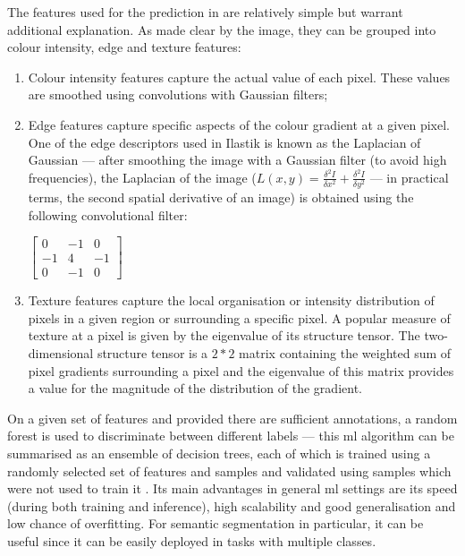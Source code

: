 \begin{figure}[!ht]
	\label{fig:segmentation-example}
\end{figure}

The features used for the prediction in  are relatively simple but warrant additional explanation. As made clear by the image, they can be grouped into colour intensity, edge and texture features:

\begin{enumerate}
	\item Colour intensity features capture the actual value of each pixel. These values are smoothed using convolutions with Gaussian filters;
	\item Edge features capture specific aspects of the colour gradient at a given pixel. One of the edge descriptors used in Ilastik is known as the Laplacian of Gaussian --- after smoothing the image with a Gaussian filter (to avoid high frequencies), the Laplacian of the image ($L(x,y) = \frac{\delta^2I}{\delta x^2} + \frac{\delta^2I}{\delta y^2}$ --- in practical terms, the second spatial derivative of an image) is obtained using the following convolutional filter:
	
			\begin{center}
				$\begin{bmatrix}0 & -1 & 0\\-1 & 4 & -1\\0 & -1 & 0\end{bmatrix}$
			\end{center}
	
	\item Texture features capture the local organisation or intensity distribution of pixels in a given region or surrounding a specific pixel. A popular measure of texture at a pixel is given by the eigenvalue of its structure tensor. The two-dimensional structure tensor is a $2*2$ matrix containing the weighted sum of pixel gradients surrounding a pixel and the eigenvalue of this matrix provides a value for the magnitude of the distribution of the gradient.
\end{enumerate}

On a given set of features and provided there are sufficient annotations, a random forest is used to discriminate between different labels --- this \ac{ml} algorithm can be summarised as an ensemble of decision trees, each of which is trained using a randomly selected set of features and samples and validated using samples which were not used to train it \cite{Breiman2001-yz}. Its main advantages in general \ac{ml} settings are its speed (during both training and inference), high scalability and good generalisation and low chance of overfitting. For semantic segmentation in particular, it can be useful since it can be easily deployed in tasks with multiple classes.

